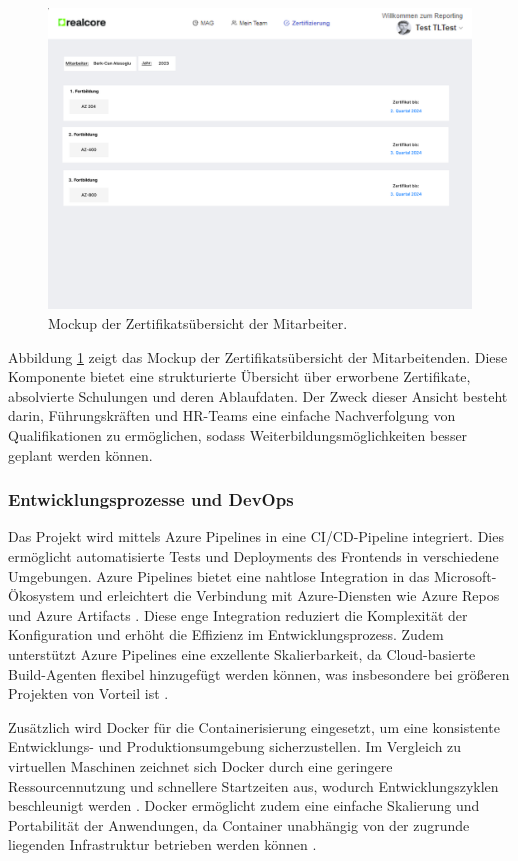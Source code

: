 \begin{figure}[h!]
    \centering
    \includegraphics[width=1.2\textwidth]{images/Zertifikat.png}
    \caption{Mockup der Zertifikatsübersicht der Mitarbeiter.}
    \label{fig:mockup3}
\end{figure}
\noindent
Abbildung \ref{fig:mockup3} zeigt das Mockup der Zertifikatsübersicht der Mitarbeitenden. Diese Komponente bietet eine strukturierte Übersicht über erworbene Zertifikate, absolvierte Schulungen und deren Ablaufdaten. Der Zweck dieser Ansicht besteht darin, Führungskräften und HR-Teams eine einfache Nachverfolgung von Qualifikationen zu ermöglichen, sodass Weiterbildungsmöglichkeiten besser geplant werden können.


\subsubsection*{Entwicklungsprozesse und DevOps} 
Das Projekt wird mittels Azure Pipelines in eine CI/CD-Pipeline integriert. Dies ermöglicht automatisierte Tests und Deployments des Frontends in verschiedene Umgebungen. Azure Pipelines bietet eine nahtlose Integration in das Microsoft-Ökosystem und erleichtert die Verbindung mit Azure-Diensten wie Azure Repos und Azure Artifacts \cite{microsoftAzurePipelines}. Diese enge Integration reduziert die Komplexität der Konfiguration und erhöht die Effizienz im Entwicklungsprozess. Zudem unterstützt Azure Pipelines eine exzellente Skalierbarkeit, da Cloud-basierte Build-Agenten flexibel hinzugefügt werden können, was insbesondere bei größeren Projekten von Vorteil ist \cite{ciCdScalability}.

Zusätzlich wird Docker für die Containerisierung eingesetzt, um eine konsistente Entwicklungs- und Produktionsumgebung sicherzustellen. Im Vergleich zu virtuellen Maschinen zeichnet sich Docker durch eine geringere Ressourcennutzung und schnellere Startzeiten aus, wodurch Entwicklungszyklen beschleunigt werden \cite{dockerVsVm}. Docker ermöglicht zudem eine einfache Skalierung und Portabilität der Anwendungen, da Container unabhängig von der zugrunde liegenden Infrastruktur betrieben werden können \cite{dockerScalability}.

